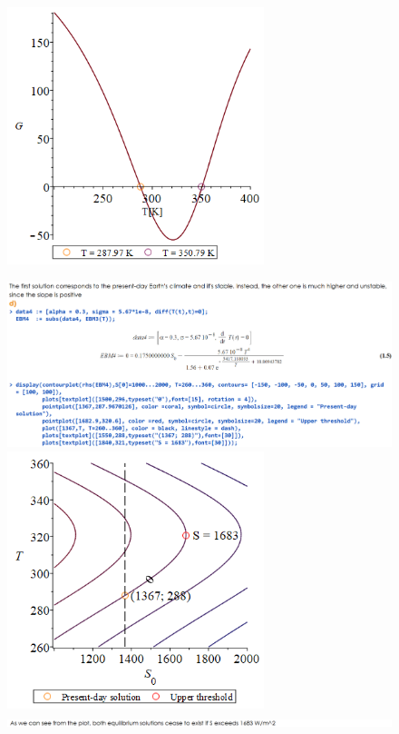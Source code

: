 \documentclass[11pt,a4paper]{article}
\begin{document}
\begin{figure}[H]
	\includegraphics[width=75mm]{images/plot5.PNG}
\end{figure}

\begin{figure}[H]
	\centering
	\includegraphics[width=150mm]{images/es2_9.PNG}
	
	\smallskip
	
	\includegraphics[width=75mm]{images/plot6.PNG}
	
	\smallskip
	
	\includegraphics[width=150mm]{images/es2_10.PNG}
	
\end{figure}
\end{document}
